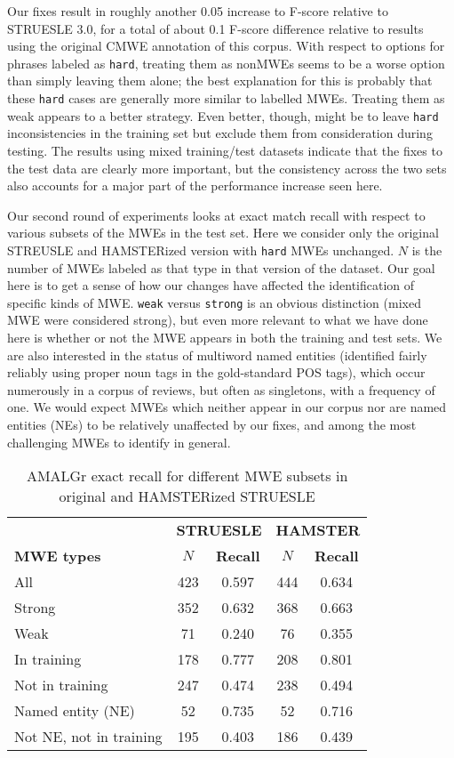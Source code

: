 \documentclass[output=paper
,modfonts
,nonflat]{langsci/langscibook}
\newcommand{\mwetype}[1]{\texttt{#1}\xspace}
\newcommand{\strongish}{\mwetype{strong}}
\newcommand{\weak}{\mwetype{weak}}
\newcommand{\hard}{\mwetype{hard}}
\newcommand{\zp}{\phantom{0}}
\begin{document}
Our fixes result in roughly another 0.05 increase to F-score relative to STRUESLE 3.0, for a total of about 0.1 F-score difference relative to results using the original CMWE annotation of this corpus. With respect to options for phrases labeled as \hard, treating them as nonMWEs seems to be a worse option than simply leaving them alone; the best explanation for this is probably that these \hard cases are generally more similar to labelled MWEs. Treating them as weak appears to a better strategy. Even better, though, might be to leave \hard inconsistencies in the training set but exclude them from consideration during testing. The results using mixed training/test datasets indicate that the fixes to the test data are clearly more important, but the consistency across the two sets also accounts for a major part of the performance increase seen here.

Our second round of experiments looks at exact match recall with respect to various subsets of the MWEs in the test set. Here we consider only the original STREUSLE and HAMSTERized version with \hard MWEs unchanged. $N$ is the number of MWEs labeled as that type in that version of the dataset. Our goal here is to get a sense of how our changes have affected the identification of specific kinds of MWE. \weak versus \strongish is an obvious distinction (mixed MWE were considered strong), but even more relevant to what we have done here is whether or not the MWE appears in both the training and test sets. We are also interested in the status of multiword named entities (identified fairly reliably using proper noun tags in the gold-standard POS tags), which occur numerously in a corpus of reviews, but often as singletons, \ie with a frequency of one. We would expect MWEs which neither appear in our corpus nor are named entities (NEs) to be relatively unaffected by our fixes, and among the most challenging MWEs to identify in general.


\begin{table*}[t!]
\caption{AMALGr exact recall for different MWE subsets in original and HAMSTERized STRUESLE} %
\begin{tabular}{l c c c c}
\toprule
&\multicolumn{2}{c}{\textbf{STRUESLE}} & \multicolumn{2}{c}{\textbf{HAMSTER}} \\
\textbf{MWE types}& \textbf{$N$}& \textbf{Recall}& \textbf{$N$} & \textbf{Recall} \\
\midrule
All & 423 & 0.597 & 444 & 0.634\\
\midrule
Strong &  352 & 0.632 & 368 & 0.663\\
Weak & \zp71& 0.240 & \zp76 & 0.355 \\
\midrule
In training & 178 & 0.777 & 208 & 0.801 \\ 
Not in training & 247 & 0.474 & 238 & 0.494 \\
\midrule
Named entity (NE)& \zp52 & 0.735 & \zp52 & 0.716 \\
Not NE, not in training & 195& 0.403 & 186& 0.439\\
\bottomrule
\end{tabular}%
\label{tab:exp2} %
\end{table*}
\end{document}
